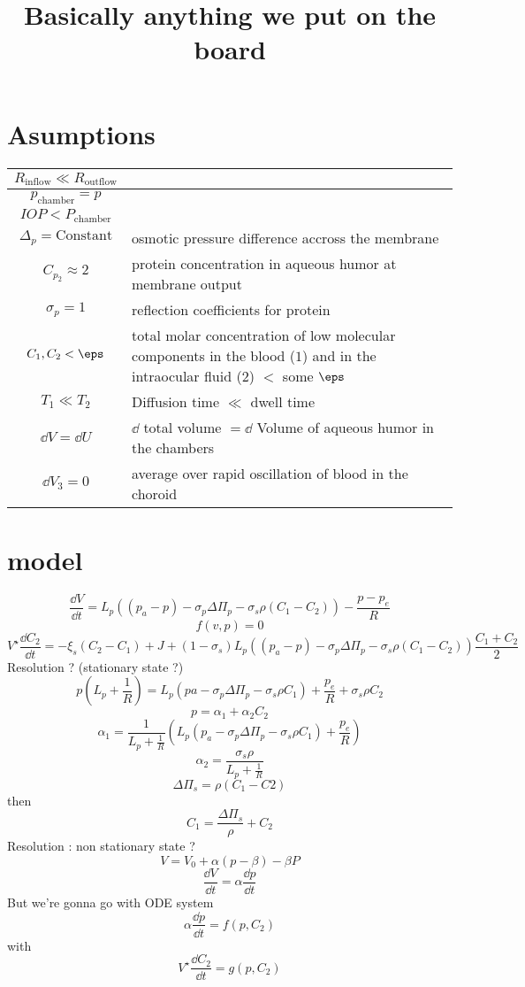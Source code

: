 \documentclass[11pt]{article}
\author{}
\title{Basically anything we put on the board}
\date{}
\begin{document}
\maketitle
\section{Asumptions}
\begin{center}
\begin{tabular}{|c|p{}|}
\hline
$R_{\mathrm{inflow}} \ll R_{\mathrm{outflow}}$&\\
\hline
$p_{\mathrm{chamber}} = p$&\\
\hline
$IOP < P_{\mathrm{chamber}}$&\\
\hline
$\Delta_p = \mathrm{Constant}$&osmotic pressure difference accross the membrane\\
\hline
$C_{p_2} \approx 2$ &protein concentration in aqueous humor at membrane output \\
\hline
$\sigma_p = 1 $ &reflection coefficients for protein\\
\hline
$C_1,C_2 < \eps$ & total molar concentration of low molecular components in the blood ($1$) and in the intraocular fluid ($2$) $<$ some  $\eps$\\
\hline
$T_1 \ll T_2$ & Diffusion time $\ll$ dwell time \\
\hline
$\dd V = \dd U$ & $\dd$ total volume $= \dd$ Volume of aqueous humor in the chambers \\
\hline
$\dd V_3 =0 $ & average over rapid oscillation of blood in the choroid\\
\hline
\end{tabular}
\end{center}


\section{model}
\[
\frac{\dd V}{\dd t} = L_{p} \left( (p_{a} -p) - \sigma_{p} \Delta \Pi_{p} - \sigma_{s} \rho (C_{1}- C_{2}) \right) - \frac{p - p_{e} }{R}
\]
\[
f(v,p) = 0
\]
\[
V^\star \frac{\dd C_2}{\dd t} = - \xi_s (C_2-C_1) + J + \left(1- \sigma_s\right)L_p\left((p_a-p) - \sigma_p \Delta \Pi_p - \sigma_s \rho (C_1-C_2) \right) \frac{C_1 + C_2}{2}
\]
Resolution ? (stationary state ?)
\[
p\left( L_p + \frac{1}{R} \right) = L_p \left(pa - \sigma_p \Delta \Pi_p - \sigma_s \rho C_1\right) + \frac{p_e}{R} + \sigma_s \rho C_2
\]
\[
p = \alpha_1 + \alpha_2 C_2
\]
\[
\alpha_1 = \frac{1}{L_p + \frac{1}{R}} \left( L_p \left( p_a - \sigma_p \Delta \Pi_p - \sigma_s \rho C_1 \right) + \frac{p_e}{R}\right)
\]
\[
\alpha_2 = \frac{\sigma_s \rho}{L_p + \frac{1}{R}}
\]
\[
\Delta \Pi_s = \rho (C_1 - C2)
\]
then
\[
C_1 = \frac{\Delta \Pi_s}{\rho} + C_2
\]
Resolution : non stationary state ?
\[
V = V_0 + \alpha (p - \beta ) - \beta P
\]
\[
\frac{\dd V}{\dd t}= \alpha \frac{\dd p}{\dd t}
\]
But we're gonna go with ODE system
\[
\alpha \frac{\dd p}{\dd t} = f(p, C_2)
\]
with
\[
V^\star \frac{\dd C_2}{\dd t} = g(p, C_2)
\]
\end{document}
